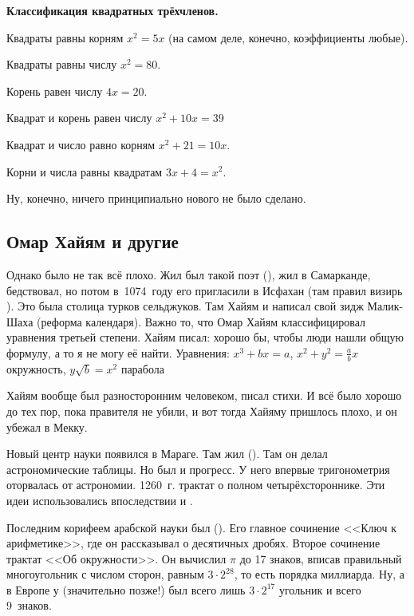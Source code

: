 \documentclass[a4paper,oneside,fleqn,10pt]{article}
\begin{document}
\textbf{Классификация квадратных трёхчленов.}

\begin{items}{-2}
\item Квадраты равны корням $x^2 = 5x$ (на самом деле, конечно,
  коэффициенты любые).
\item Квадраты равны числу $x^2 = 80$.
\item Корень равен числу $4x = 20$.
\item Квадрат и корень равен числу $x^2 + 10x = 39$
\item Квадрат и число равно корням $x^2 + 21 = 10x$.
\item Корни и числа равны квадратам $3x + 4 = x^2$.
\end{items}

Ну, конечно, ничего принципиально нового не было сделано.

\subsection{Омар Хайям и другие}

Однако было не так всё плохо. Жил был такой поэт  (), жил в Самарканде, бедствовал, но
потом в~1074~году его пригласили в Исфахан (там правил визирь
). Это была столица турков сельджуков.  Там Хайям
и написал свой зидж Малик-Шаха (реформа календаря).  Важно то, что
Омар Хайям классифицировал уравнения третьей степени.  Хайям писал:
хорошо бы, чтобы люди нашли общую формулу, а то я не могу её найти.
Уравнения: $x^3 + bx = a$, $x^2 + y^2 = \frac{a}{b} x$ окружность, $y
\sqrt b = x^2$ парабола

Хайям вообще был разносторонним человеком, писал стихи.  И всё было
хорошо до тех пор, пока правителя не убили, и вот тогда Хайяму
пришлось плохо, и он убежал в Мекку.

Новый центр науки появился в Мараге. Там жил 
().  Там он делал астрономические таблицы.  Но был и
прогресс. У него впервые тригонометрия оторвалась от астрономии.
1260~г. трактат о полном четырёхстороннике.  Эти идеи использовались
впоследствии  и
.

Последним корифеем арабской науки был 
().  Его главное сочинение <<Ключ к арифметике>>, где он
рассказывал о десятичных дробях.  Второе сочинение трактат <<Об
окружности>>. Он вычислил $\pi$ до 17 знаков, вписав правильный
многоугольник с числом сторон, равным $3\cdot 2^{28}$, то есть порядка
миллиарда.  Ну, а в Европе у  (значительно позже!)
был всего лишь $3\cdot 2^{17}$ угольник и всего 9~знаков.
\end{document}
